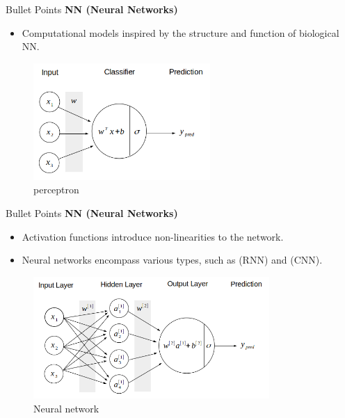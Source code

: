 \documentclass[aspectratio=169,xcolor=dvipsnames, t]{beamer}
\begin{document}
\begin{frame}{Bullet Points}
    \textbf{NN (Neural Networks)}
    \begin{itemize}
        \item Computational models inspired by the structure and function of biological NN.
    \end{itemize}
\end{frame}
\begin{frame}{}
    \begin{figure}
    \centering
    \includegraphics[width=0.6\textwidth]{images/ml-blog14-01.png}
    \caption{perceptron}
    \label{fig:example}
\end{figure}
\end{frame}


\begin{frame}{Bullet Points}
    \textbf{NN (Neural Networks)}
    \begin{itemize}
        \item Activation functions introduce non-linearities to the network.
        \item Neural networks encompass various types, such as (RNN) and (CNN).
    \end{itemize}
\end{frame}

\begin{frame}{}
    \begin{figure}
    \centering
    \includegraphics[width=0.8\textwidth]{images/ml-blog14-02.png}
    \caption{Neural network}
    \label{fig:example}
\end{figure}
\end{frame}
\end{document}

